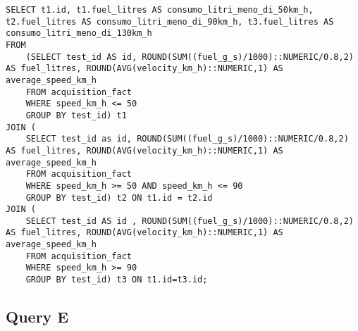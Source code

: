 \begin{lstlisting}[language=mySQL]
SELECT t1.id, t1.fuel_litres AS consumo_litri_meno_di_50km_h, t2.fuel_litres AS consumo_litri_meno_di_90km_h, t3.fuel_litres AS consumo_litri_meno_di_130km_h
FROM
	(SELECT test_id AS id, ROUND(SUM((fuel_g_s)/1000)::NUMERIC/0.8,2) AS fuel_litres, ROUND(AVG(velocity_km_h)::NUMERIC,1) AS average_speed_km_h
	FROM acquisition_fact
	WHERE speed_km_h <= 50
	GROUP BY test_id) t1
JOIN (
	SELECT test_id as id, ROUND(SUM((fuel_g_s)/1000)::NUMERIC/0.8,2) AS fuel_litres, ROUND(AVG(velocity_km_h)::NUMERIC,1) AS average_speed_km_h
	FROM acquisition_fact
	WHERE speed_km_h >= 50 AND speed_km_h <= 90
	GROUP BY test_id) t2 ON t1.id = t2.id
JOIN (
	SELECT test_id AS id , ROUND(SUM((fuel_g_s)/1000)::NUMERIC/0.8,2) AS fuel_litres, ROUND(AVG(velocity_km_h)::NUMERIC,1) AS average_speed_km_h
	FROM acquisition_fact
	WHERE speed_km_h >= 90
	GROUP BY test_id) t3 ON t1.id=t3.id;
\end{lstlisting}

\subsection{Query E}
